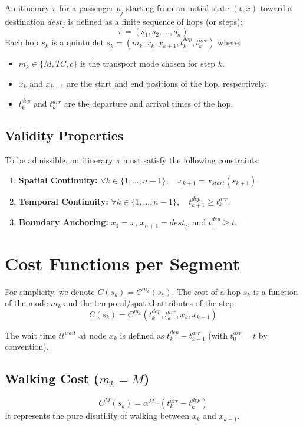 \documentclass[12pt,a4paper]{article}
\begin{document}
An itinerary $\pi$ for a passenger $p_j$ starting from an initial state $(t, x)$ toward a destination $dest_j$ is defined as a finite sequence of hops (or steps):
\[ \pi = (s_1, s_2, \dots, s_n) \]
Each hop $s_k$ is a quintuplet $s_k = (m_k, x_k, x_{k+1}, t_k^{dep}, t_k^{arr})$ where:
\begin{itemize}
    \item $m_k \in \{M, TC, c\}$ is the transport mode chosen for step $k$.
    \item $x_k$ and $x_{k+1}$ are the start and end positions of the hop, respectively.
    \item $t_k^{dep}$ and $t_k^{arr}$ are the departure and arrival times of the hop.
\end{itemize}

\subsection{Validity Properties}
To be admissible, an itinerary $\pi$ must satisfy the following constraints:
\begin{enumerate}
    \item \textbf{Spatial Continuity:} $\forall k \in \{1, \dots, n-1\}, \quad x_{k+1} = x_{start}(s_{k+1})$.
    \item \textbf{Temporal Continuity:} $\forall k \in \{1, \dots, n-1\}, \quad t_{k+1}^{dep} \ge t_k^{arr}$.
    \item \textbf{Boundary Anchoring:} $x_1 = x$, $x_{n+1} = dest_j$, and $t_1^{dep} \ge t$.
\end{enumerate}

\section{Cost Functions per Segment}

For simplicity, we denote $C(s_k) = C^{m_k}(s_k)$. The cost of a hop $s_k$ is a function of the mode $m_k$ and the temporal/spatial attributes of the step:
\[ C(s_k) = C^{m_k}(t_k^{dep}, t_k^{arr}, x_k, x_{k+1}) \]

The wait time $tt^{wait}$ at node $x_k$ is defined as $t_k^{dep} - t_{k-1}^{arr}$ (with $t_0^{arr} = t$ by convention).

\subsection{Walking Cost ($m_k = M$)}
\[ C^M(s_k) = \alpha^M \cdot (t_k^{arr} - t_k^{dep}) \]
It represents the pure disutility of walking between $x_k$ and $x_{k+1}$.
\end{document}
